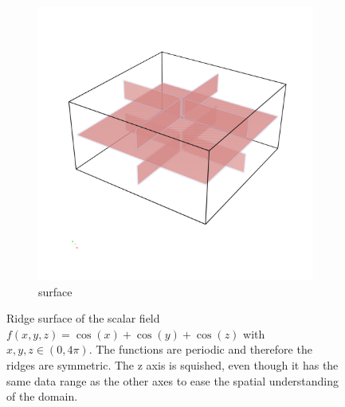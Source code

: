 \begin{figure}
\begin{subfigure}[b]{0.49\textwidth}
        \includegraphics[width=\textwidth]{Images/ridge.png}
        \caption{surface}
    \end{subfigure}
    \caption{Ridge surface of the scalar field $f(x,y,z)=\cos(x)+\cos(y)
    +\cos(z)$ with $x,y,z \in (0, 4\pi)$. The functions are periodic and
    therefore the ridges are symmetric. The z axis is squished, even though
    it has the same data range as the other axes to ease the spatial
    understanding of the domain.}
    \label{fig:ridge}
\end{figure}


